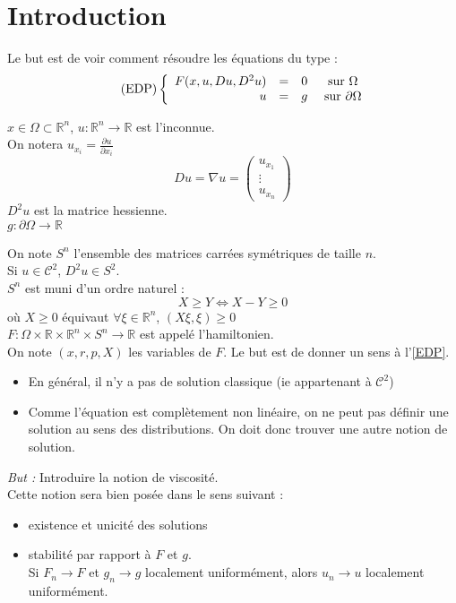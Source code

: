 \part*{Introduction}
Le but est de voir comment résoudre les équations du type :
\begin{equation} \label{EDP} \tag{EDP} 
\left\{ \begin{array}{r c c c}
	F(x,u,Du,D^2u)&=&0 &\text{ sur } \Omega\\
	u&=&g &\text{ sur } \partial\Omega
\end{array}\right.
\end{equation}

$x\in\Omega\subset\mathbb{R}^n$, $u:\mathbb{R}^n\to\mathbb{R}$ est l'inconnue.\\
On notera $u_{x_i}=\frac{\partial u}{\partial x_i}$\\
\[Du=\nabla u=\begin{pmatrix} u_{x_1}\\ \vdots \\ u_{x_n} \end{pmatrix}\]
$D^2u$ est la matrice hessienne.\\
$g:\partial\Omega\to\mathbb{R}$

\bigskip
On note $S^n$ l'ensemble des matrices carrées symétriques de taille $n$.\\
Si $u\in\mathscr{C}^2$, $D^2u\in S^2$.\\
$S^n$ est muni d'un ordre naturel :
	\[X\geq Y \Leftrightarrow X-Y\geq 0\]
où $X\geq0$ équivaut $\forall \xi\in\mathbb{R}^n$, $(X\xi,\xi)\geq0$\\

$F:\Omega\times\mathbb{R}\times\mathbb{R}^n\times S^n \to \mathbb{R}$ est appelé l'hamiltonien.\\
On note $(x,r,p,X)$ les variables de $F$. Le but est de donner un sens à l'\ref{EDP}.

\begin{itemize}
	\item En général, il n'y a pas de solution classique (ie appartenant à $\mathscr{C}^2$)
	\item Comme l'équation est complètement non linéaire, on ne peut pas définir une solution au sens des distributions. On doit donc trouver une autre notion de solution.
\end{itemize}

\bigskip
\textit{But :} Introduire la notion de viscosité.\\
Cette notion sera bien posée dans le sens suivant :
\begin{itemize}
	\item existence et unicité des solutions
	\item stabilité par rapport à $F$ et $g$.\\
Si $F_n\to F$ et $g_n\to g$ localement uniformément, alors $u_n\to u$ localement uniformément.
\end{itemize}

